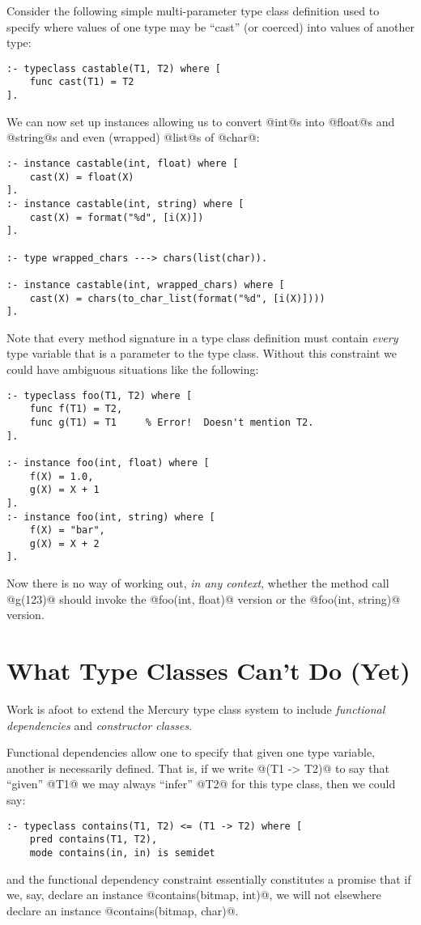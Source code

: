 Consider the following simple multi-parameter type class definition used
to specify where values of one type may be ``cast'' (or coerced) into
values of another type:
\begin{verbatim}
:- typeclass castable(T1, T2) where [
    func cast(T1) = T2
].
\end{verbatim}
We can now set up instances allowing us to convert @int@s into @float@s
and @string@s and even (wrapped) @list@s of @char@:
\begin{verbatim}
:- instance castable(int, float) where [
    cast(X) = float(X)
].
:- instance castable(int, string) where [
    cast(X) = format("%d", [i(X)])
].

:- type wrapped_chars ---> chars(list(char)).

:- instance castable(int, wrapped_chars) where [
    cast(X) = chars(to_char_list(format("%d", [i(X)])))
].
\end{verbatim}

Note that every method signature in a type class definition must contain
\emph{every} type variable that is a parameter to the type class.
Without this constraint we could have ambiguous situations like the
following:
\begin{verbatim}
:- typeclass foo(T1, T2) where [
    func f(T1) = T2,
    func g(T1) = T1     % Error!  Doesn't mention T2.
].

:- instance foo(int, float) where [
    f(X) = 1.0,
    g(X) = X + 1
].
:- instance foo(int, string) where [
    f(X) = "bar",
    g(X) = X + 2
].
\end{verbatim}
Now there is no way of working out, \emph{in any context}, whether the
method call @g(123)@ should invoke the @foo(int, float)@ version or the
@foo(int, string)@ version.

\section{What Type Classes Can't Do (Yet)}

Work is afoot to extend the Mercury type class system to include
\emph{functional dependencies} and \emph{constructor classes}.

Functional dependencies allow one to specify that given one type
variable, another is necessarily defined.  That is, if we write
@(T1 -> T2)@ to say that ``given'' @T1@ we may always ``infer'' @T2@ for
this type class, then we could say:
\begin{verbatim}
:- typeclass contains(T1, T2) <= (T1 -> T2) where [
    pred contains(T1, T2),
    mode contains(in, in) is semidet
\end{verbatim}
and the functional dependency constraint essentially constitutes a
promise that if we, say,  declare an instance @contains(bitmap, int)@,
we will not elsewhere declare an instance @contains(bitmap, char)@.

